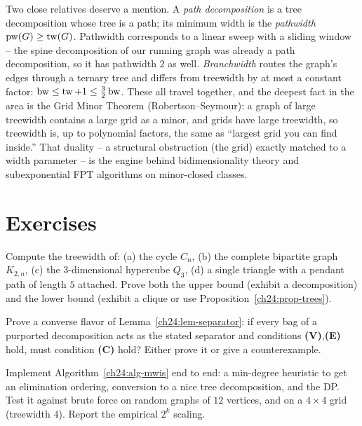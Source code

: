 Two close relatives deserve a mention. A \emph{path decomposition} is a tree
decomposition whose tree is a path; its minimum width is the \emph{pathwidth}
$\mathrm{pw}(G)\ge\operatorname{tw}(G)$. Pathwidth corresponds to a linear sweep with a
sliding window -- the spine decomposition of our running graph was already a path
decomposition, so it has pathwidth $2$ as well. \emph{Branchwidth} routes the
graph's edges through a ternary tree and differs from treewidth by at most a
constant factor: $\mathrm{bw}\le\operatorname{tw}+1\le\tfrac{3}{2}\,\mathrm{bw}$. These all
travel together, and the deepest fact in the area is the Grid Minor Theorem
(Robertson--Seymour): a graph of large treewidth contains a large grid as a minor,
and grids have large treewidth, so treewidth is, up to polynomial factors, the
same as ``largest grid you can find inside.'' That duality -- a structural
obstruction (the grid) exactly matched to a width parameter -- is the engine
behind bidimensionality theory and subexponential FPT algorithms on minor-closed
classes.

\section{Exercises}
\label{ch24:exercises}

\begin{exercise}
Compute the treewidth of: (a) the cycle $C_n$, (b) the complete bipartite graph
$K_{2,n}$, (c) the $3$-dimensional hypercube $Q_3$, (d) a single triangle with a
pendant path of length $5$ attached. Prove both the upper bound (exhibit a
decomposition) and the lower bound (exhibit a clique or use
Proposition~\ref{ch24:prop-trees}).
\end{exercise}

\begin{exercise}
Prove a converse flavor of Lemma~\ref{ch24:lem-separator}: if every bag of a
purported decomposition acts as the stated separator and conditions
\textbf{(V)},\textbf{(E)} hold, must condition \textbf{(C)} hold? Either prove it
or give a counterexample.
\end{exercise}

\begin{exercise}
Implement Algorithm~\ref{ch24:alg-mwis} end to end: a min-degree heuristic to get
an elimination ordering, conversion to a nice tree decomposition, and the DP. Test
it against brute force on random graphs of $12$ vertices, and on a $4\times4$ grid
(treewidth $4$). Report the empirical $2^k$ scaling.
\end{exercise}

